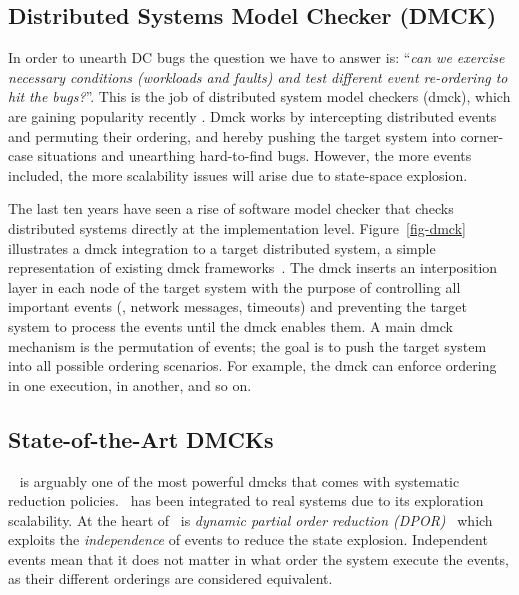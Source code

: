 \subsection{Distributed Systems Model Checker (DMCK)}

In order to unearth DC bugs the question we have to answer is: ``{\em can we
exercise necessary conditions (\ie workloads and faults) and test different
event re-ordering to hit the bugs?}''. This is the job of distributed system
model checkers (dmck), which are gaining popularity recently
\cite{Guo+11-Demeter, Killian+07-LifeDeathMaceMC, Simsa+10-Dbug,
Yang+09-Modist}. Dmck works by intercepting distributed events and permuting
their ordering, and hereby pushing the target system into corner-case situations
and unearthing hard-to-find bugs. However, the more events included, the more
scalability issues will arise due to state-space explosion.



The last ten years have seen a rise of software model checker that checks
distributed systems directly at the implementation level.  Figure~\ref{fig-dmck}
illustrates a dmck integration to a target distributed system, a simple
representation of existing dmck frameworks~\cite{Guo+11-Demeter,
Killian+07-LifeDeathMaceMC, Simsa+10-Dbug, Yang+09-Modist}.  The dmck inserts an
interposition layer in each node of the target system with the purpose of
controlling all important events (\eg, network messages, timeouts) and
preventing the target system to process the events until the dmck enables them.
A main dmck mechanism is the permutation of events; the goal is to push the
target system into all possible ordering scenarios.  For example, the dmck can
enforce  ordering in one execution,  in another, and so on.


\subsection{State-of-the-Art DMCKs}

\modist~\cite{Yang+09-Modist} is arguably one of the most powerful
dmcks that comes with systematic reduction policies.  \modist\ has been
integrated to real systems due to its exploration
scalability.  At the heart of \modist\ is {\em dynamic partial order
  reduction (DPOR)}~\cite{Flanagan+05-Dpor} which exploits the {\em
  independence} of events to reduce the state explosion.  Independent
events mean that it does not matter in what order the system execute
the events, as their different orderings are considered equivalent.

